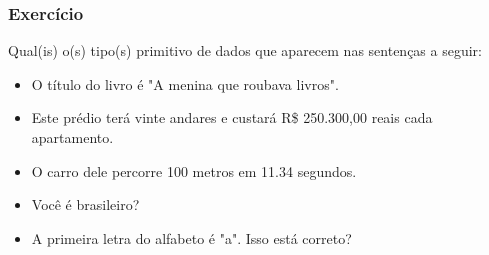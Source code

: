 \begin{frame}
	\frametitle{Exercício}
	Qual(is) o(s) tipo(s) primitivo de dados que aparecem nas sentenças a seguir:
	\begin{itemize}
		\item O título do livro é "A menina que roubava livros".
		\item Este prédio terá vinte andares e custará R\$ 250.300,00 reais cada apartamento.
		\item O carro dele percorre 100 metros em 11.34 segundos.
		\item Você é brasileiro?
		\item A primeira letra do alfabeto é "a". Isso está correto?
	\end{itemize}
\end{frame}